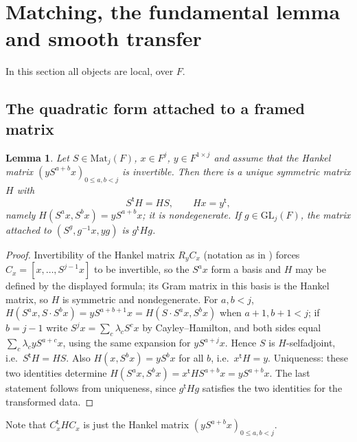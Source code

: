 \documentclass[11pt,oneside,notitlepage]{book}
\numberwithin{equation}{section}
\theoremstyle{plain}
\newtheorem{lemma}[theorem]{Lemma}
\theoremstyle{definition}
\newcommand{\GL}{\mathrm{GL}}
\newcommand{\Mat}{\mathrm{Mat}}
\begin{document}

\section{Matching, the fundamental lemma and smooth transfer}\label{sec:FL}

In this section all objects are local, over $F$.

\subsection*{The quadratic form attached to a framed matrix}

\begin{lemma}\label{lem:Q0}
Let $S\in\Mat_j(F)$, $x\in F^j$, $y\in F^{1\times j}$ and assume that the Hankel matrix $(yS^{a+b}x)_{0\le a,b<j}$ is invertible. Then there is a unique symmetric matrix $H$ with
\[S^{\mathsf t}H=HS,\qquad Hx=y^{\mathsf t},\]
namely $H(S^ax,S^bx)=yS^{a+b}x$; it is nondegenerate. If $g\in\GL_j(F)$, the matrix attached to $(S^g,g^{-1}x,yg)$ is $g^{\mathsf t}Hg$.
\end{lemma}
\begin{proof}
Invertibility of the Hankel matrix $R_yC_x$ (notation as in ) forces $C_x=[x,\dots,S^{j-1}x]$ to be invertible, so the $S^ax$ form a basis and $H$ may be defined by the displayed formula; its Gram matrix in this basis is the Hankel matrix, so $H$ is symmetric and nondegenerate. For $a,b<j$, $H(S^ax,S\cdot S^bx)=yS^{a+b+1}x=H(S\cdot S^ax,S^bx)$ when $a+1,b+1<j$; if $b=j-1$ write $S^jx=\sum_c\lambda_cS^cx$ by Cayley--Hamilton, and both sides equal $\sum_c\lambda_cyS^{a+c}x$, using the same expansion for $yS^{a+j}x$. Hence $S$ is $H$-selfadjoint, i.e.\ $S^{\mathsf t}H=HS$. Also $H(x,S^bx)=yS^bx$ for all $b$, i.e.\ $x^{\mathsf t}H=y$. Uniqueness: these two identities determine $H(S^ax,S^bx)=x^{\mathsf t}HS^{a+b}x=yS^{a+b}x$. The last statement follows from uniqueness, since $g^{\mathsf t}Hg$ satisfies the two identities for the transformed data.
\end{proof}
Note that $C_x^{\mathsf t}H C_x$ is just the Hankel matrix $(yS^{a+b}x)_{0\le a,b<j}$.
\end{document}
